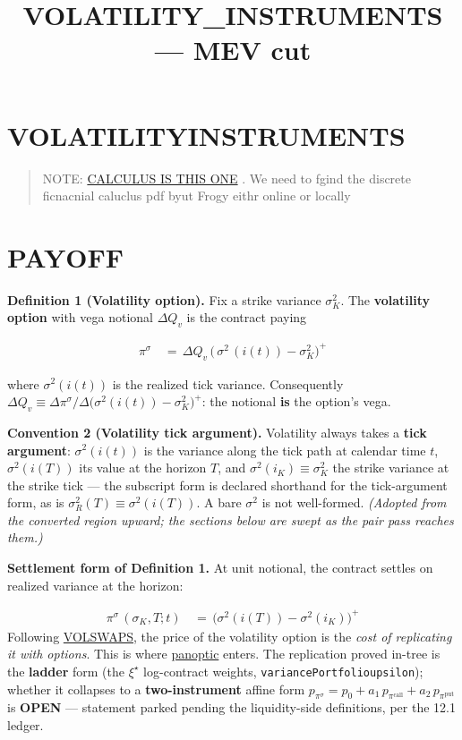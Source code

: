 \documentclass[11pt]{article}
\title{VOLATILITY\_INSTRUMENTS --- MEV cut}
\renewcommand{\_}{\textunderscore\allowbreak}
\begin{document}
\section*{VOLATILITY\_INSTRUMENTS}\label{volatility_instruments}

\begin{quote}
NOTE: \href{~/learning/cfmm-theory/cfmm-discrete/**}{CALCULUS IS THIS ONE} . We need to fgind the discrete ficnacnial caluclus pdf byut Frogy eithr online or locally
\end{quote}

\section*{PAYOFF}\label{payoff}

\textbf{Definition 1 (Volatility option).} Fix a strike variance \(\sigma^2_K\). The \textbf{volatility option} with vega notional \(\Delta Q_v\) is the contract paying

\[
    \begin{aligned}
        \pi^{\sigma} \, &= \, \Delta Q_{v} \, \Big ( \, \sigma^2 \, (i (t)) - \sigma^2_K\Big)^{+}
    \end{aligned}
\]

where \(\sigma^2(i(t))\) is the realized tick variance. Consequently \(\Delta Q_v \equiv \Delta \pi^{\sigma} / \Delta\big(\sigma^2(i(t)) - \sigma^2_K\big)^{+}\): the notional \textbf{is} the option's vega.

\textbf{Convention 2 (Volatility tick argument).} Volatility always takes a \textbf{tick argument}: \(\sigma^2(i(t))\) is the variance along the tick path at calendar time \(t\), \(\sigma^2(i(T))\) its value at the horizon \(T\), and \(\sigma^2(i_K) \equiv \sigma^2_K\) the strike variance at the strike tick --- the subscript form is declared shorthand for the tick-argument form, as is \(\sigma^2_R(T) \equiv \sigma^2(i(T))\). A bare \(\sigma^2\) is not well-formed. \emph{(Adopted from the converted region upward; the sections below are swept as the pair pass reaches them.)}

\textbf{Settlement form of Definition 1.} At unit notional, the contract settles on realized variance at the horizon:

\[
    \begin{aligned}
        \pi^{\sigma} \, (\sigma_K, T; t) \, &= \, \Big (\sigma^2(i(T)) - \sigma^2(i_K)\Big)^{+}
    \end{aligned}
\] Following \href{../refs/DemeterfietalVarianceSwaps.pdf}{VOL\_SWAPS}, the price of the volatility option is the \emph{cost of replicating it with options}. This is where \href{https://arxiv.org/pdf/2204.14232}{panoptic} enters. The replication proved in-tree is the \textbf{ladder} form (the \(\xi^\star\) log-contract weights, \texttt{variancePortfolio\_upsilon}); whether it collapses to a \textbf{two-instrument} affine form \(p_{\pi^\sigma} = p_0 + a_1\, p_{\pi^{\text{call}}} + a_2\, p_{\pi^{\text{put}}}\) is \textbf{OPEN} --- statement parked pending the liquidity-side definitions, per the 12.1 ledger.
\end{document}
